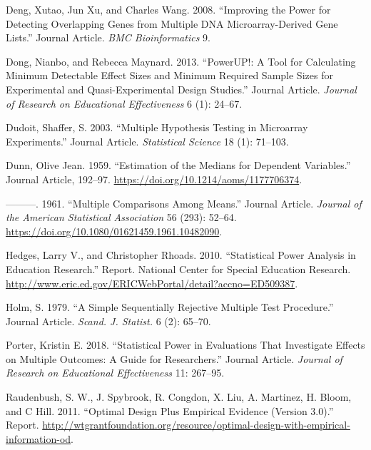 \documentclass[
]{article}
\newlength{\cslhangindent}
\newlength{\cslentryspacingunit} %
\newenvironment{CSLReferences}[2] %
 {%
  \setlength{\parindent}{0pt}
  \ifodd #1
  \let\oldpar\par
  \def\par{\hangindent=\cslhangindent\oldpar}
  \fi
  \setlength{\parskip}{#2\cslentryspacingunit}
 }%
 {}
\begin{document}
\begin{CSLReferences}{1}{0}
\leavevmode{}%
Deng, Xutao, Jun Xu, and Charles Wang. 2008. {``Improving the Power for
Detecting Overlapping Genes from Multiple DNA Microarray-Derived Gene
Lists.''} Journal Article. \emph{BMC Bioinformatics} 9.

\leavevmode{}%
Dong, Nianbo, and Rebecca Maynard. 2013. {``PowerUP!: A Tool for
Calculating Minimum Detectable Effect Sizes and Minimum Required Sample
Sizes for Experimental and Quasi-Experimental Design Studies.''} Journal
Article. \emph{Journal of Research on Educational Effectiveness} 6 (1):
24--67.

\leavevmode{}%
Dudoit, Shaffer, S. 2003. {``Multiple Hypothesis Testing in Microarray
Experiments.''} Journal Article. \emph{Statistical Science} 18 (1):
71--103.

\leavevmode{}%
Dunn, Olive Jean. 1959. {``Estimation of the Medians for Dependent
Variables.''} Journal Article, 192--97.
\url{https://doi.org/10.1214/aoms/1177706374}.

\leavevmode{}%
---------. 1961. {``Multiple Comparisons Among Means.''} Journal
Article. \emph{Journal of the American Statistical Association} 56
(293): 52--64. \url{https://doi.org/10.1080/01621459.1961.10482090}.

\leavevmode{}%
Hedges, Larry V., and Christopher Rhoads. 2010. {``Statistical Power
Analysis in Education Research.''} Report. National Center for Special
Education Research.
\url{http://www.eric.ed.gov/ERICWebPortal/detail?accno=ED509387}.

\leavevmode{}%
Holm, S. 1979. {``A Simple Sequentially Rejective Multiple Test
Procedure.''} Journal Article. \emph{Scand. J. Statist.} 6 (2): 65--70.

\leavevmode{}%
Porter, Kristin E. 2018. {``Statistical Power in Evaluations That
Investigate Effects on Multiple Outcomes: A Guide for Researchers.''}
Journal Article. \emph{Journal of Research on Educational Effectiveness}
11: 267--95.

\leavevmode{}%
Raudenbush, S. W., J. Spybrook, R. Congdon, X. Liu, A. Martinez, H.
Bloom, and C Hill. 2011. {``Optimal Design Plus Empirical Evidence
(Version 3.0).''} Report.
\url{http://wtgrantfoundation.org/resource/optimal-design-with-empirical-information-od}.


\end{CSLReferences}
\end{document}
